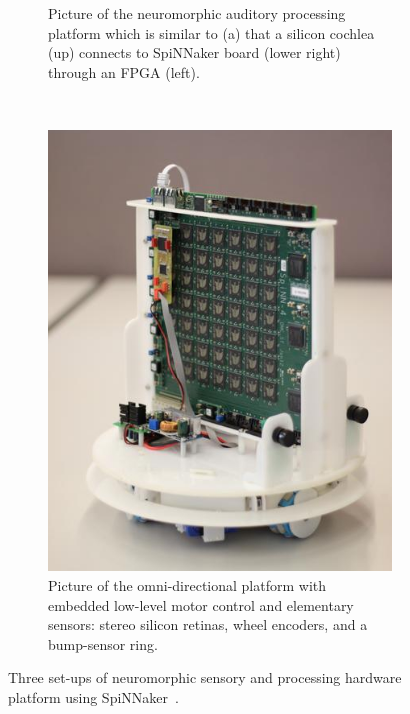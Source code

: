 \begin{figure}[tbp!]
\begin{subfigure}[t]{0.528\textwidth}
		\caption{Picture of the neuromorphic auditory processing platform which is similar to (a) that a silicon cochlea (up) connects to SpiNNaker board (lower right) through an FPGA (left).}
	\end{subfigure}
	~~
	\begin{subfigure}[t]{0.4\textwidth}
		\includegraphics[width=\textwidth]{pics_snn/omnibot.jpg}
		\caption{Picture of the omni-directional platform with embedded low-level motor control and elementary sensors: stereo silicon retinas, wheel encoders, and a bump-sensor ring.}
	\end{subfigure}
	\caption{Three set-ups of neuromorphic sensory and processing hardware platform using SpiNNaker~\cite{furber2014spinnaker}.}
	\label{Fig:close-loop}
\end{figure}

